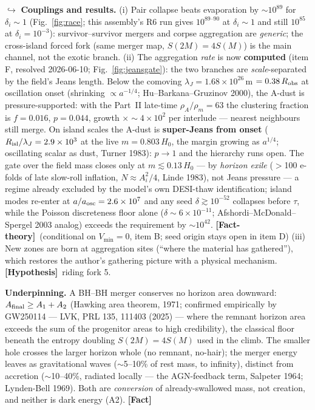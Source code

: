 \documentclass[11pt]{article}
\newcommand{\Fact}{\textbf{\textcolor{green!45!black}{[Fact]}}}
\newcommand{\Hyp}{\textbf{\textcolor{blue!55!black}{[Hypothesis]}}}
\newcommand{\factth}{\textcolor{green!40!black}{\textbf{[Fact-theory]}}}
\begin{document}
$\hookrightarrow$ \textbf{Couplings and results.} (i) Pair collapse beats evaporation by $\sim\!10^{89}$ for $\delta_i\sim1$ (Fig.~\ref{fig:race}; this assembly's R6 run gives $10^{89\text{--}90}$ at $\delta_i\sim1$ and still $10^{85}$ at $\delta_i=10^{-3}$): survivor--survivor mergers and corpse aggregation are \emph{generic}; the cross-island forced fork (same merger map, $S(2M)=4S(M)$) is the main channel, not the exotic branch. (ii) The aggregation \emph{rate} is now \textbf{computed} (item F, resolved 2026-06-10; Fig.~\ref{fig:jeansgate}): the two branches are \emph{scale}-separated by the field's Jeans length. Below the comoving $\lambda_J=1.68\times10^{26}$\,m $=0.38\,R_{\rm obs}$ at oscillation onset (shrinking $\propto a^{-1/4}$; Hu--Barkana--Gruzinov 2000), the A-dust is pressure-supported: with the Part~II late-time $\rho_A/\rho_m=63$ the clustering fraction is $f=0.016$, $p=0.044$, growth $\times\!\sim\!4\times10^2$ per interlude --- nearest neighbours still merge. On island scales the A-dust is \textbf{super-Jeans from onset} ($R_{\rm isl}/\lambda_J=2.9\times10^3$ at the live $m=0.803\,H_0$, the margin growing as $a^{1/4}$; oscillating scalar as dust, Turner 1983): $p\to1$ and the hierarchy runs open. The gate over the field mass closes only at $m\lesssim0.13\,H_0$ --- by \emph{horizon exile} ($>$100 e-folds of late slow-roll inflation, $N\approx A_i^2/4$, Linde 1983), not Jeans pressure --- a regime already excluded by the model's own DESI-thaw identification; island modes re-enter at $a/a_{\rm osc}=2.6\times10^7$ and any seed $\delta\gtrsim10^{-52}$ collapses before $\tau$, while the Poisson discreteness floor alone ($\delta\sim6\times10^{-11}$; Afshordi--McDonald--Spergel 2003 analog) exceeds the requirement by $\sim\!10^{42}$. \factth\ (conditional on $V_{\min}=0$, item B; seed origin stays open in item D) (iii) New zones are born at aggregation sites (``where the material has gathered''), which restores the author's gathering picture with a physical mechanism. \Hyp\ riding fork 5.

\textbf{Underpinning.} A BH--BH merger conserves no horizon area downward: $A_{\rm final}\ge A_1+A_2$ (Hawking area theorem, 1971; confirmed empirically by GW250114 --- LVK, PRL 135, 111403 (2025) --- where the remnant horizon area exceeds the sum of the progenitor areas to high credibility), the classical floor beneath the entropy doubling $S(2M)=4S(M)$ used in the climb. The smaller hole crosses the larger horizon whole (no remnant, no-hair); the merger energy leaves as gravitational waves ($\sim$5--10\% of rest mass, to infinity), distinct from accretion ($\sim$10--40\%, radiated locally --- the AGN-feedback term, Salpeter 1964; Lynden-Bell 1969). Both are \emph{conversion} of already-swallowed mass, not creation, and neither is dark energy (A2). \Fact
\end{document}
